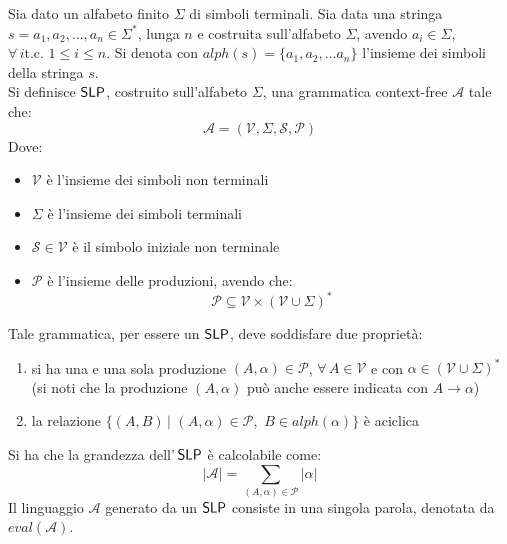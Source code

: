\begin{definizione}
  Sia dato un alfabeto finito $\Sigma$ di simboli terminali. Sia data una
  stringa $s=a_1,a_2,\ldots, a_n\in\Sigma^{*}$, lunga $n$ e costruita
  sull'alfabeto $\Sigma$, avendo $a_i\in\Sigma$, $\forall\, i \mbox{
    t.c. }1\leq i\leq n$. Si denota con $alph(s)=\{a_1,a_2,\ldots
  a_n\}$ l'insieme dei simboli della stringa $s$.\\
  Si definisce $\mbox{\rm {\sf SLP}}$, costruito sull'alfabeto $\Sigma$, una grammatica
  context-free $\mathcal{A}$ tale che: 
  \begin{equation}
    \label{eq:slpdef}
    \mathcal{A}=\left(\mathcal{V}, \Sigma, \mathcal{S}, \mathcal{P}\right)
  \end{equation}
  Dove:
  \begin{itemize}
    \item $\mathcal{V}$ è l'insieme dei simboli non terminali
    \item $\Sigma$ è l'insieme dei simboli terminali
    \item $\mathcal{S}\in \mathcal{V}$ è il simbolo iniziale non terminale
    \item $\mathcal{P}$ è l'insieme delle produzioni, avendo che:
    \begin{equation}
      \label{eq:slpprod}
      \mathcal{P}\subseteq \mathcal{V}\times\left(\mathcal{V}\cup
        \Sigma\right)^{*}
    \end{equation}
  \end{itemize}
  Tale grammatica, per essere un $\mbox{\rm {\sf SLP}}$, deve soddisfare due proprietà:
  \begin{enumerate}
    \item si ha una e una sola produzione $(A,\alpha)\in \mathcal{P}$,
    $\forall\, A\in \mathcal{V}$ e con $\alpha\in
    \left(\mathcal{V}\cup\Sigma\right)^{*}$ (si 
    noti che la produzione $(A,\alpha)$ può anche essere indicata con
    $A\to\alpha$) 
    \item la relazione $\{(A,B)\,|\,\,(A,\alpha)\in\mathcal{P},\,\,B\in
    alph(\alpha)\}$ è aciclica
  \end{enumerate}
  Si ha che la grandezza dell'$\,\mbox{\rm {\sf SLP}}$ è calcolabile come:
  \begin{equation}
    \label{eq:slplen}
    |\mathcal{A}| = \sum_{(A,\alpha)\in\mathcal{P}}|\alpha|
  \end{equation}
  Il linguaggio $\mathcal{A}$ generato da un $\mbox{\rm {\sf SLP}}$ consiste in una singola
  parola, denotata da $eval(\mathcal{A})$. 
\end{definizione}
